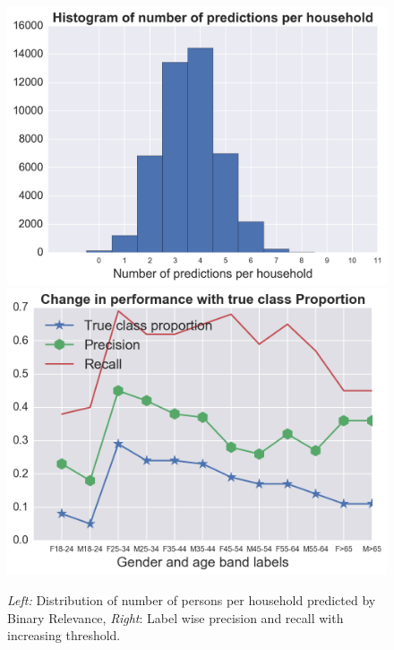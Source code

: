 %
\begin{figure}
\setlength{\belowcaptionskip}{-10pt}
  \captionsetup{font=small}
  \centering
  \includegraphics[width=.45\linewidth]{predictionHistogram2.png}
  \includegraphics[width=.45\linewidth]{br_allLabels2.png}
  \caption{\textit{Left:} Distribution of number of persons per household predicted by Binary Relevance, \textit{Right}: Label wise precision and recall with increasing threshold.}
  \label{fig:histogram-br}
\end{figure}


